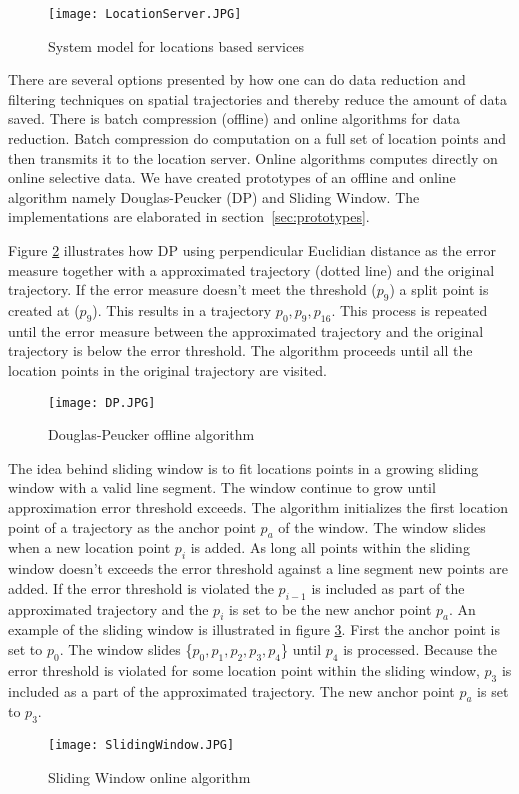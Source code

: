 \begin{figure}[H]
\centering
\texttt{[image: LocationServer.JPG]}

\caption{System model for locations based services}
\label{fig:system_model_for_locations_based_services}
\end{figure}


There are several options presented by \cite{Lee2011} how one can do data reduction and filtering techniques on spatial trajectories and thereby reduce the amount of data saved. There is batch compression (offline) and online algorithms for data reduction. Batch compression do computation on a full set of location points and then transmits it to the location server. Online algorithms computes directly on online selective data. We have created prototypes  of an offline and online algorithm namely Douglas-Peucker (DP) and Sliding Window. The implementations are elaborated in section~\ref{sec:prototypes}. 

Figure \ref{fig:douglas_peucker_algorithm} illustrates how DP using perpendicular Euclidian distance as the error measure together with a approximated trajectory (dotted line) and the original trajectory. If the error measure doesn't meet the threshold ($p_9$) a split point is created at ($p_9$). This results in a trajectory $p_0,p_9,p_{16}$. This process is repeated until the error measure between the approximated trajectory and the original trajectory is below the error threshold. The algorithm proceeds until all the location points in the original trajectory are visited.   

\begin{figure}[H]
\centering
\texttt{[image: DP.JPG]}
\caption{Douglas-Peucker offline algorithm}
\label{fig:douglas_peucker_algorithm}
\end{figure}


The idea behind sliding window is to fit locations points in a growing sliding window with a valid line segment. The window continue to grow until approximation error threshold exceeds. The algorithm initializes the first location point of a trajectory as the anchor point $p_a$ of the window. The window slides when a new location point $p_i$ is added. As long all points within the sliding window doesn't exceeds the error threshold against a line segment new points are added. If the error threshold is violated the $p_{i-1}$ is included as part of the approximated trajectory and the $p_i$ is set to be the new anchor point $p_a$. An example of the sliding window is illustrated in figure \ref{fig:sliding_window_algorithm}. First the anchor point is set to $p_0$. The window slides \{$p_0,p_1,p_2,p_3,p_4$\} until $p_4$ is processed. Because the error threshold is violated for some location point within the sliding window, $p_3$ is included as a part of the approximated trajectory. The new anchor point $p_a$ is set to $p_3$.       
\begin{figure}[H]
\centering
\texttt{[image: SlidingWindow.JPG]}

\caption{Sliding Window online algorithm}
\label{fig:sliding_window_algorithm}
\end{figure}


